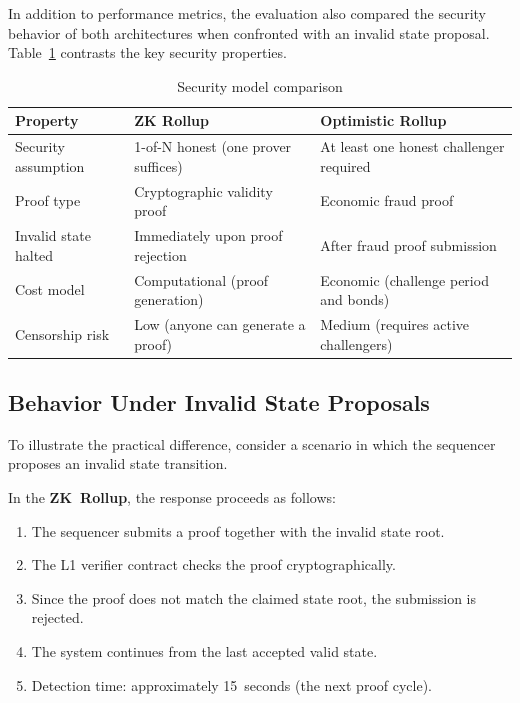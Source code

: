 \documentclass[
]{elteikthesis}[2024/04/26]
\begin{document}
In addition to performance metrics, the evaluation also compared the security behavior of both architectures when confronted with an invalid state proposal. Table~\ref{tab:security-models} contrasts the key security properties.

\begin{table}[h]
    \centering
    \begin{tabular}{l|p{4cm}|p{4cm}}
        \hline
        \textbf{Property} & \textbf{ZK Rollup} & \textbf{Optimistic Rollup} \\
        \hline
        Security assumption & 1-of-N honest (one prover suffices) & At least one honest challenger required \\
        \hline
        Proof type & Cryptographic validity proof & Economic fraud proof \\
        \hline
        Invalid state halted & Immediately upon proof rejection & After fraud proof submission \\
        \hline
        Cost model & Computational (proof generation) & Economic (challenge period and bonds) \\
        \hline
        Censorship risk & Low (anyone can generate a proof) & Medium (requires active challengers) \\
        \hline
    \end{tabular}
    \caption{Security model comparison}
    \label{tab:security-models}
\end{table}

\subsection{Behavior Under Invalid State Proposals}

To illustrate the practical difference, consider a scenario in which the sequencer proposes an invalid state transition.

In the \textbf{ZK~Rollup}, the response proceeds as follows:
\begin{enumerate}
    \item The sequencer submits a proof together with the invalid state root.
    \item The L1 verifier contract checks the proof cryptographically.
    \item Since the proof does not match the claimed state root, the submission is rejected.
    \item The system continues from the last accepted valid state.
    \item Detection time: approximately 15~seconds (the next proof cycle).
\end{enumerate}
\end{document}
